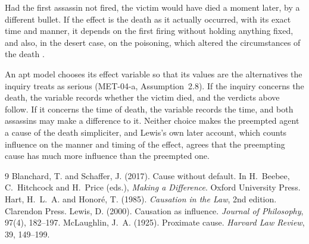 \documentclass{situationist-preprint}
\begin{document}
\begin{objection}[Fragility]
Had the first assassin not fired, the victim would have died a moment later, by a different bullet. If the effect is the death as it actually occurred, with its exact time and manner, it depends on the first firing without holding anything fixed, and also, in the desert case, on the poisoning, which altered the circumstances of the death \citep{Lewis2000}.
\end{objection}

\begin{reply}
An apt model chooses its effect variable so that its values are the alternatives the inquiry treats as serious (MET-04-a, Assumption~2.8). If the inquiry concerns the death, the variable records whether the victim died, and the verdicts above follow. If it concerns the time of death, the variable records the time, and both assassins may make a difference to it. Neither choice makes the preempted agent a cause of the death simpliciter, and Lewis's own later account, which counts influence on the manner and timing of the effect, agrees that the preempting cause has much more influence than the preempted one.
\end{reply}

\begin{thebibliography}{9}\small
{} Blanchard, T. and Schaffer, J. (2017). Cause without default. In H.~Beebee, C.~Hitchcock and H.~Price (eds.), \emph{Making a Difference}. Oxford University Press.
 Hart, H.~L.~A. and Honor\'e, T. (1985). \emph{Causation in the Law}, 2nd edition. Clarendon Press.
 Lewis, D. (2000). Causation as influence. \emph{Journal of Philosophy}, 97(4), 182--197.
 McLaughlin, J.~A. (1925). Proximate cause. \emph{Harvard Law Review}, 39, 149--199.
\end{thebibliography}
\end{document}

